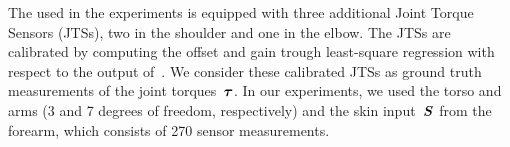  
	The \robot{} used in the experiments is equipped with three additional Joint Torque Sensors (JTSs), two in the shoulder and one in the elbow.
	The JTSs are calibrated by computing the offset and gain trough least-square regression with respect to the output of~\idyn{}.
	We consider these calibrated JTSs as ground truth measurements of the joint torques~$\boldsymbol {\tau}$.
    	In our experiments, we used the \robot{} torso and arms (3 and 7 degrees of freedom, respectively) and the skin input~$\mathcal{\boldsymbol S}$ from the forearm, which consists of 270 sensor measurements.



